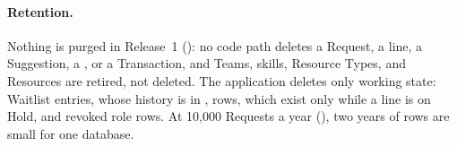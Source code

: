 \paragraph{Retention.} Nothing is purged in Release~1 (): no code path deletes a Request, a line, a Suggestion, a , or a Transaction, and Teams, skills, Resource Types, and Resources are retired, not deleted. The application deletes only working state: Waitlist entries, whose history is in ,  rows, which exist only while a line is on Hold, and revoked role rows. At 10,000 Requests a year (), two years of rows are small for one database.
\endgroup
